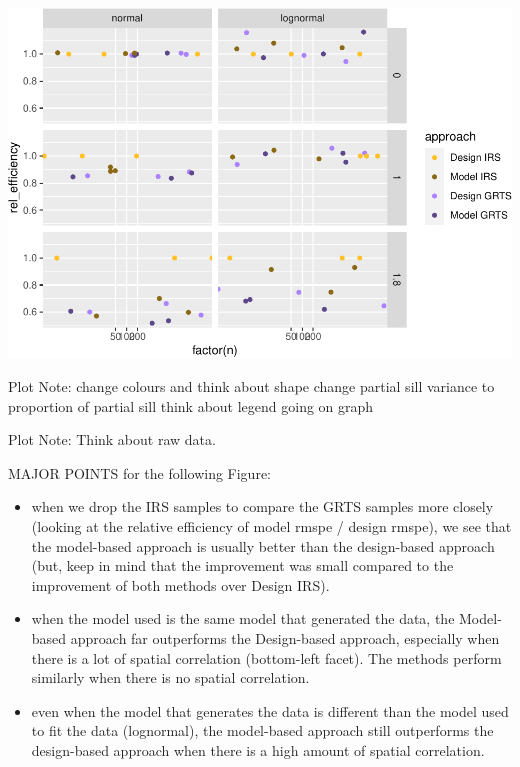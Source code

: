 \documentclass[]{elsarticle} %
\providecommand{\tightlist}{%
  \setlength{\itemsep}{0pt}\setlength{\parskip}{0pt}}
\begin{document}
\includegraphics{SpatialDVM_Manuscript_files/figure-latex/unnamed-chunk-5-1.pdf}

Plot Note: change colours and think about shape change partial sill
variance to proportion of partial sill think about legend going on graph

Plot Note: Think about raw data.

MAJOR POINTS for the following Figure:

\begin{itemize}
\tightlist
\item
  when we drop the IRS samples to compare the GRTS samples more closely
  (looking at the relative efficiency of model rmspe / design rmspe), we
  see that the model-based approach is usually better than the
  design-based approach (but, keep in mind that the improvement was
  small compared to the improvement of both methods over Design IRS).
\item
  when the model used is the same model that generated the data, the
  Model-based approach far outperforms the Design-based approach,
  especially when there is a lot of spatial correlation (bottom-left
  facet). The methods perform similarly when there is no spatial
  correlation.
\item
  even when the model that generates the data is different than the
  model used to fit the data (lognormal), the model-based approach still
  outperforms the design-based approach when there is a high amount of
  spatial correlation.
\end{itemize}
\end{document}
